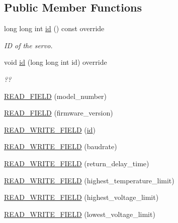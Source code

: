 \subsection*{Public Member Functions}
\begin{DoxyCompactItemize}
\item 
long long int \hyperlink{classdynamixel_1_1servos_1_1_servo_a2d022081672e25a7bb57b76706e1cc57}{id} () const override
\begin{DoxyCompactList}\small\item\em ID of the servo. \end{DoxyCompactList}\item 
void \hyperlink{classdynamixel_1_1servos_1_1_servo_a866e0cdb2ee9f3c622305634368b18f2}{id} (long long int id) override
\begin{DoxyCompactList}\small\item\em ?? \end{DoxyCompactList}\item 
\hyperlink{classdynamixel_1_1servos_1_1_servo_a1e066990c79024cc63d7e5ac53fcf51b}{R\+E\+A\+D\+\_\+\+F\+I\+E\+LD} (model\+\_\+number)
\item 
\hyperlink{classdynamixel_1_1servos_1_1_servo_a1331b1d5876dc2bc640194aff7d5be34}{R\+E\+A\+D\+\_\+\+F\+I\+E\+LD} (firmware\+\_\+version)
\item 
\hyperlink{classdynamixel_1_1servos_1_1_servo_a6ac8b76a420b2b576231f71bd5c0c3bb}{R\+E\+A\+D\+\_\+\+W\+R\+I\+T\+E\+\_\+\+F\+I\+E\+LD} (\hyperlink{classdynamixel_1_1servos_1_1_servo_a2d022081672e25a7bb57b76706e1cc57}{id})
\item 
\hyperlink{classdynamixel_1_1servos_1_1_servo_a5960b4dc9b4fb5013ceb5790d241429c}{R\+E\+A\+D\+\_\+\+W\+R\+I\+T\+E\+\_\+\+F\+I\+E\+LD} (baudrate)
\item 
\hyperlink{classdynamixel_1_1servos_1_1_servo_a48eb1bdd305f5db2b326f187708f95d8}{R\+E\+A\+D\+\_\+\+W\+R\+I\+T\+E\+\_\+\+F\+I\+E\+LD} (return\+\_\+delay\+\_\+time)
\item 
\hyperlink{classdynamixel_1_1servos_1_1_servo_a0cc74d325cb6326c6bb877467a77d035}{R\+E\+A\+D\+\_\+\+W\+R\+I\+T\+E\+\_\+\+F\+I\+E\+LD} (highest\+\_\+temperature\+\_\+limit)
\item 
\hyperlink{classdynamixel_1_1servos_1_1_servo_a2cebb6bb933ce04c08954a1d28024be6}{R\+E\+A\+D\+\_\+\+W\+R\+I\+T\+E\+\_\+\+F\+I\+E\+LD} (highest\+\_\+voltage\+\_\+limit)
\item 
\hyperlink{classdynamixel_1_1servos_1_1_servo_a05bb43c819899c966245b2bd3efdd3cd}{R\+E\+A\+D\+\_\+\+W\+R\+I\+T\+E\+\_\+\+F\+I\+E\+LD} (lowest\+\_\+voltage\+\_\+limit)

\end{DoxyCompactItemize}
